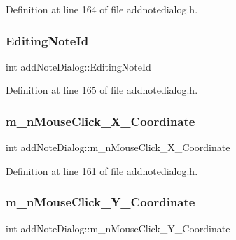 Definition at line 164 of file addnotedialog.\+h.

\hypertarget{classaddNoteDialog_abd614b0fe0725fb5b2cc485acaf1e334}{}\label{classaddNoteDialog_abd614b0fe0725fb5b2cc485acaf1e334} 
\subsubsection{\texorpdfstring{Editing\+Note\+Id}{EditingNoteId}}
{\footnotesize\ttfamily int add\+Note\+Dialog\+::\+Editing\+Note\+Id\hspace{0.3cm}{\ttfamily [private]}}



Definition at line 165 of file addnotedialog.\+h.

\hypertarget{classaddNoteDialog_af54413cf6c84a6610266d9c616f44541}{}\label{classaddNoteDialog_af54413cf6c84a6610266d9c616f44541} 
\subsubsection{\texorpdfstring{m\+\_\+n\+Mouse\+Click\+\_\+\+X\+\_\+\+Coordinate}{m\_nMouseClick\_X\_Coordinate}}
{\footnotesize\ttfamily int add\+Note\+Dialog\+::m\+\_\+n\+Mouse\+Click\+\_\+\+X\+\_\+\+Coordinate\hspace{0.3cm}{\ttfamily [private]}}



Definition at line 161 of file addnotedialog.\+h.

\hypertarget{classaddNoteDialog_aeb0351ab1bbcc76899f21224ddf4d374}{}\label{classaddNoteDialog_aeb0351ab1bbcc76899f21224ddf4d374} 
\subsubsection{\texorpdfstring{m\+\_\+n\+Mouse\+Click\+\_\+\+Y\+\_\+\+Coordinate}{m\_nMouseClick\_Y\_Coordinate}}
{\footnotesize\ttfamily int add\+Note\+Dialog\+::m\+\_\+n\+Mouse\+Click\+\_\+\+Y\+\_\+\+Coordinate\hspace{0.3cm}{\ttfamily [private]}}



